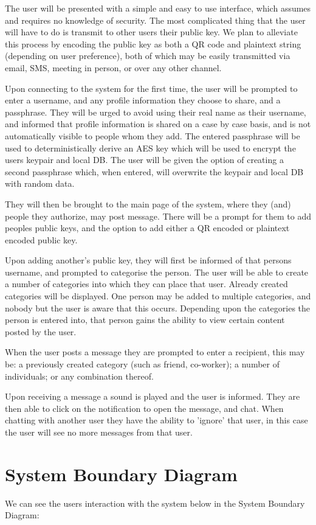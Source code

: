 The user will be presented with a simple and easy to use interface, which
assumes and requires no knowledge of security. The most complicated thing that
the user will have to do is transmit to other users their public key. We plan
to alleviate this process by encoding the public key as both a QR code and
plaintext string (depending on user preference), both of which may be easily
transmitted via email, SMS, meeting in person, or over any other channel.

Upon connecting to the system for the first time, the user will be prompted to
enter a username, and any profile information they choose to share, and a
passphrase. They will be urged to avoid using their real name as their username,
and informed that profile information is shared on a case by case basis, and is
not automatically visible to people whom they add. The entered passphrase will
be used to deterministically derive an AES key which will be used to encrypt the
users keypair and local DB. The user will be given the option of creating a
second passphrase which, when entered, will overwrite the keypair and local DB
with random data.

They will then be brought to the main page of the system, where they (and)
people they authorize, may post message. There will be a prompt for them to add
peoples public keys, and the option to add either a QR encoded or plaintext
encoded public key.

Upon adding another's public key, they will first be informed of that persons
username, and prompted to categorise the person. The user will be able to create
a number of categories into which they can place that user. Already created
categories will be displayed. One person may be added to multiple categories,
and nobody but the user is aware that this occurs. Depending upon the categories
the person is entered into, that person gains the ability to view certain
content posted by the user.

When the user posts a message they are prompted to enter a recipient, this may
be: a previously created category (such as friend, co-worker); a number
of individuals; or any combination thereof.

Upon receiving a message a sound is played and the user is informed. They are
then able to click on the notification to open the message, and chat. When
chatting with another user they have the ability to 'ignore' that user, in this
case the user will see no more messages from that user.

\section{System Boundary Diagram}
We can see the users interaction with the system below in the System Boundary 
Diagram:

